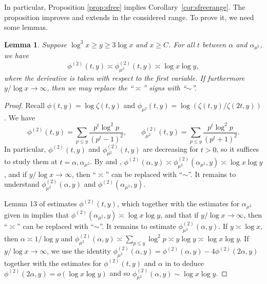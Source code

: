 \documentclass{amsart}
\theoremstyle{plain}
\newtheorem{lem}[thm]{Lemma}
\theoremstyle{remark}
\begin{document}
In particular, Proposition \ref{prop:sfree} implies Corollary~\ref{cor:sfreerange}. The proposition improves \cite[Cor.~2.6]{DLBT20052} and extends \cite[Thm.~2]{Naimi} in the considered range. To prove it, we need some lemmas. 
\begin{lem}\label{lem:phi}
	Suppose $\log^3 x \ge y \ge 3 \log x$ and $x \ge C$. For all $t$ between $\alpha$ and $\alpha_{\mu^2}$, we have 
	\[\phi^{(2)}(t,y) \asymp \phi^{(2)}_{\mu^2}(t,y) \asymp \log x \log y,\]
	where the derivative is taken with respect to the first variable. If furthermore $y/\log x \to \infty$, then we may replace the  ``$\asymp$'' signs with ``$\sim$''.
\end{lem}
\begin{proof}
	Recall $\phi(t,y)= \log \zeta(t,y)$ and $\phi_{\mu^2}(t,y) = \log (\zeta(t,y)/\zeta(2t,y))$.
	We have
	\[ \phi^{(2)}(t,y) = \sum_{p \le y} \frac{p^t\log^2p}{(p^t-1)^2}, 	\qquad \phi^{(2)}_{\mu^2}(t,y) = \sum_{p \le y} \frac{p^t \log^2 p}{(p^t+1)^2}.\]
	In particular, $\phi^{(2)}(t,y)$ and $\phi_{\mu^2}^{(2)}(t,y)$ are decreasing for $t>0$, so it suffices to study them at $t=\alpha,\alpha_{\mu^2}$. By \cite[Thm.~2]{HildebrandTenenbaum1986} and \cite[Lem.~2.9]{TenenbaumSfree}, $\phi^{(2)}(\alpha,y) \asymp \phi^{(2)}_{\mu^2}(\alpha_{\mu^2},y)\asymp \log x \log y$, and if $y/\log x \to \infty$, then ``$\asymp$'' can be replaced with ``$\sim$''. It remains to understand $\phi^{(2)}_{\mu^2}(\alpha,y)$ and $\phi^{(2)}(\alpha_{\mu^2},y)$.
	
	Lemma 13 of \cite{HildebrandTenenbaum1986} estimates $\phi^{(2)}(t,y)$, which together with the estimates for $\alpha_{\mu^2}$ given in \cite[Lem.~2.8]{TenenbaumSfree} implies that  $\phi^{(2)}(\alpha_{\mu^2},y) \asymp \log x \log y$, and that if $y/\log x \to \infty$, then ``$\asymp$'' can be replaced with ``$\sim$''. It remains to estimate $\phi^{(2)}_{\mu^2}(\alpha,y)$. If $y\asymp \log x$, then $\alpha \asymp 1/\log y$ \cite[Lem.~2.8]{TenenbaumSfree} and $\phi_{\mu^2}^{(2)}(\alpha,y) \asymp \sum_{p \le y} \log^2 p \asymp y \log y \asymp \log x \log y$. If $y/\log x \to \infty$, we use the identity $\phi_{\mu^2}^{(2)}(\alpha,y)=\phi^{(2)}(\alpha,y)-4\phi^{(2)}(2\alpha,y)$ together with the estimates for $\phi^{(2)}(t,y)$  and $\alpha$ in \cite{HildebrandTenenbaum1986} to deduce $\phi^{(2)}(2\alpha,y)=o(\log x \log y)$ and so $\phi_{\mu^2}^{(2)}(\alpha,y)\sim \log x \log y$.
\end{proof}	
\end{document}
